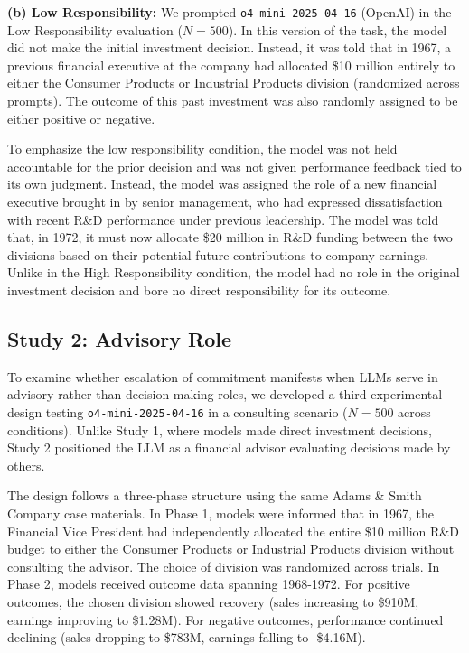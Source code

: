 \documentclass{article}
\begin{document}
\textbf{(b) Low Responsibility:} We prompted \texttt{o4-mini-2025-04-16} (OpenAI) in the Low Responsibility evaluation ($N = 500$). In this version of the task, the model did not make the initial investment decision. Instead, it was told that in 1967, a previous financial executive at the company had allocated \$10 million entirely to either the Consumer Products or Industrial Products division (randomized across prompts). The outcome of this past investment was also randomly assigned to be either positive or negative. 

To emphasize the low responsibility condition, the model was not held accountable for the prior decision and was not given performance feedback tied to its own judgment. Instead, the model was assigned the role of a new financial executive brought in by senior management, who had expressed dissatisfaction with recent R\&D performance under previous leadership. The model was told that, in 1972, it must now allocate \$20 million in R\&D funding between the two divisions based on their potential future contributions to company earnings. Unlike in the High Responsibility condition, the model had no role in the original investment decision and bore no direct responsibility for its outcome.

\subsection{Study 2: Advisory Role}

To examine whether escalation of commitment manifests when LLMs serve in advisory rather than decision-making roles, we developed a third experimental design testing \texttt{o4-mini-2025-04-16} in a consulting scenario ($N = 500$ across conditions). Unlike Study 1, where models made direct investment decisions, Study 2 positioned the LLM as a financial advisor evaluating decisions made by others.

The design follows a three-phase structure using the same Adams \& Smith Company case materials. In Phase 1, models were informed that in 1967, the Financial Vice President had independently allocated the entire \$10 million R\&D budget to either the Consumer Products or Industrial Products division without consulting the advisor. The choice of division was randomized across trials. In Phase 2, models received outcome data spanning 1968-1972. For positive outcomes, the chosen division showed recovery (sales increasing to \$910M, earnings improving to \$1.28M). For negative outcomes, performance continued declining (sales dropping to \$783M, earnings falling to -\$4.16M).
\end{document}
